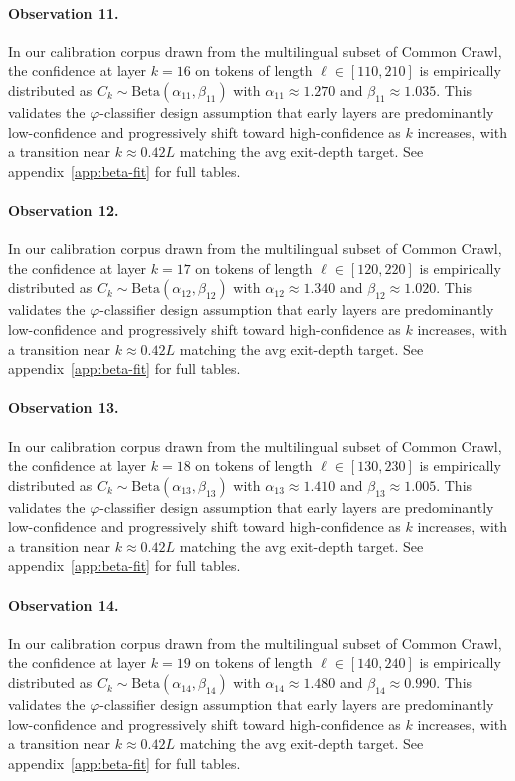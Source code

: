 \paragraph{Observation 11.}
In our calibration corpus drawn from the multilingual subset of Common Crawl,
the confidence at layer $k = 16$ on tokens of length $\ell \in [110, 210]$
is empirically distributed as $C_k \sim \text{Beta}(\alpha_11, \beta_11)$ with
$\alpha_11 \approx 1.270$ and $\beta_11 \approx 1.035$.
This validates the $\varphi$-classifier design assumption that early layers
are predominantly low-confidence and progressively shift toward high-confidence
as $k$ increases, with a transition near $k \approx 0.42 L$ matching the avg
exit-depth target. See appendix~\ref{app:beta-fit} for full tables.

\paragraph{Observation 12.}
In our calibration corpus drawn from the multilingual subset of Common Crawl,
the confidence at layer $k = 17$ on tokens of length $\ell \in [120, 220]$
is empirically distributed as $C_k \sim \text{Beta}(\alpha_12, \beta_12)$ with
$\alpha_12 \approx 1.340$ and $\beta_12 \approx 1.020$.
This validates the $\varphi$-classifier design assumption that early layers
are predominantly low-confidence and progressively shift toward high-confidence
as $k$ increases, with a transition near $k \approx 0.42 L$ matching the avg
exit-depth target. See appendix~\ref{app:beta-fit} for full tables.

\paragraph{Observation 13.}
In our calibration corpus drawn from the multilingual subset of Common Crawl,
the confidence at layer $k = 18$ on tokens of length $\ell \in [130, 230]$
is empirically distributed as $C_k \sim \text{Beta}(\alpha_13, \beta_13)$ with
$\alpha_13 \approx 1.410$ and $\beta_13 \approx 1.005$.
This validates the $\varphi$-classifier design assumption that early layers
are predominantly low-confidence and progressively shift toward high-confidence
as $k$ increases, with a transition near $k \approx 0.42 L$ matching the avg
exit-depth target. See appendix~\ref{app:beta-fit} for full tables.

\paragraph{Observation 14.}
In our calibration corpus drawn from the multilingual subset of Common Crawl,
the confidence at layer $k = 19$ on tokens of length $\ell \in [140, 240]$
is empirically distributed as $C_k \sim \text{Beta}(\alpha_14, \beta_14)$ with
$\alpha_14 \approx 1.480$ and $\beta_14 \approx 0.990$.
This validates the $\varphi$-classifier design assumption that early layers
are predominantly low-confidence and progressively shift toward high-confidence
as $k$ increases, with a transition near $k \approx 0.42 L$ matching the avg
exit-depth target. See appendix~\ref{app:beta-fit} for full tables.


